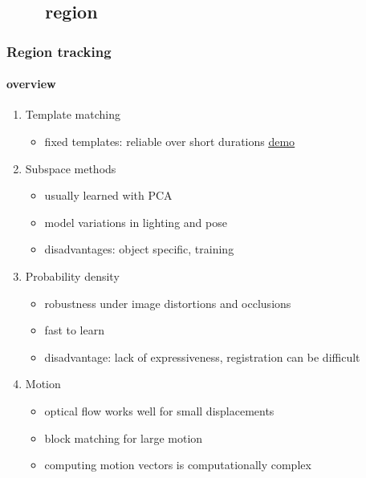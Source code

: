 
\subsection{\ \ \ \ region}
\begin{frame}
\frametitle{Region tracking}
\framesubtitle{overview}
\logoCSIPCPL\mypagenum
	\begin{enumerate}
		\item Template matching
			\begin{itemize}
				\item fixed templates: reliable over short durations \href{run:distribute/run_TRK_templateMatching.bat}{{\color{blue}\underline {demo}}}
			\end{itemize}
		\item Subspace methods
			\begin{itemize}
				\item usually learned with PCA
				\item model variations in lighting and pose
				\item disadvantages: object specific, training
			\end{itemize}			
		\item Probability density
			\begin{itemize}
				\item robustness under image distortions and occlusions
				\item fast to learn
				\item disadvantage: lack of expressiveness, registration can be difficult
			\end{itemize}
		\item Motion
			\begin{itemize}
				\item optical flow works well for small displacements
				\item block matching for large motion
				\item computing motion vectors is computationally complex
			\end{itemize}
	\end{enumerate}
\end{frame}





